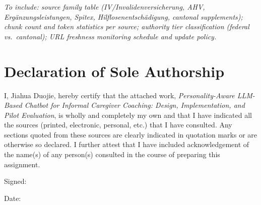 \documentclass[10pt,a4paper]{report}
\begin{document}
\begin{tcolorbox}[colback=gray!6!white, colframe=gray!50!black, title=\textbf{Placeholder --- Swiss Policy Corpus}, left=4pt, right=4pt]
\textit{To include: source family table (IV/Invalidenversicherung, AHV, Ergänzungsleistungen, Spitex, Hilflosenentschädigung, cantonal supplements); chunk count and token statistics per source; authority tier classification (federal vs.\ cantonal); URL freshness monitoring schedule and update policy.}
\end{tcolorbox}

\chapter*{Declaration of Sole Authorship}

I, Jiahua Duojie, hereby certify that the attached work, \emph{Personality-Aware LLM-Based Chatbot for Informal Caregiver Coaching: Design, Implementation, and Pilot Evaluation}, is wholly and completely my own and that I have indicated all the sources (printed, electronic, personal, etc.) that I have consulted. Any sections quoted from these sources are clearly indicated in quotation marks or are otherwise so declared. I further attest that I have included acknowledgement of the name(s) of any person(s) consulted in the course of preparing this assignment.

\vspace{2cm}
Signed: \underline{\hspace{5cm}}

Date: \underline{\hspace{5cm}}
\end{document}
